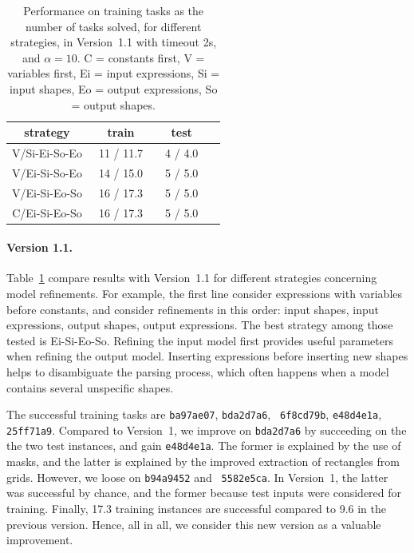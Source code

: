 \documentclass[a4paper]{llncs}
\begin{document}
\begin{table}[t]
  \centering
  \caption{Performance on training tasks as the number of tasks solved, for different strategies, in Version~1.1 with timeout 2s, and $\alpha=10$. C = constants first, V = variables first, Ei = input expressions, Si = input shapes, Eo = output expressions, So = output shapes.}
  \begin{tabular}{|c|c|c|c|}
    \hline
    strategy & train & test \\
    \hline
    V/Si-Ei-So-Eo & ~11 / 11.7~ & ~4 / 4.0~ \\
    V/Ei-Si-So-Eo & ~14 / 15.0~ & ~5 / 5.0~ \\
    V/Ei-Si-Eo-So & ~16 / 17.3~ & ~5 / 5.0~ \\
    C/Ei-Si-Eo-So & ~16 / 17.3~ & ~5 / 5.0~ \\
    \hline
  \end{tabular}
  \label{tab:v11:strategies}
\end{table}

\paragraph{Version 1.1.}  Table~\ref{tab:v11:strategies} compare
results with Version~1.1 for different strategies concerning model
refinements. For example, the first line consider expressions with
variables before constants, and consider refinements in this order:
input shapes, input expressions, output shapes, output expressions.
The best strategy among those tested is Ei-Si-Eo-So. Refining the
input model first provides useful parameters when refining the output
model. Inserting expressions before inserting new shapes helps to
disambiguate the parsing process, which often happens when a model
contains several unspecific shapes.

The successful training tasks are {\tt ba97ae07}, {\tt bda2d7a6}, {\tt
  6f8cd79b}, {\tt e48d4e1a}, {\tt 25ff71a9}. Compared to Version~1, we
improve on {\tt bda2d7a6} by succeeding on the the two test instances,
and gain {\tt e48d4e1a}. The former is explained by the use of masks,
and the latter is explained by the improved extraction of rectangles
from grids.
%
However, we loose on {\tt b94a9452} and {\tt
  5582e5ca}. In Version~1, the latter was successful by chance, and
the former because test inputs were considered for training.
%
Finally, 17.3 training instances are successful compared to 9.6 in the
previous version. Hence, all in all, we consider this new version as a
valuable improvement.
\end{document}
